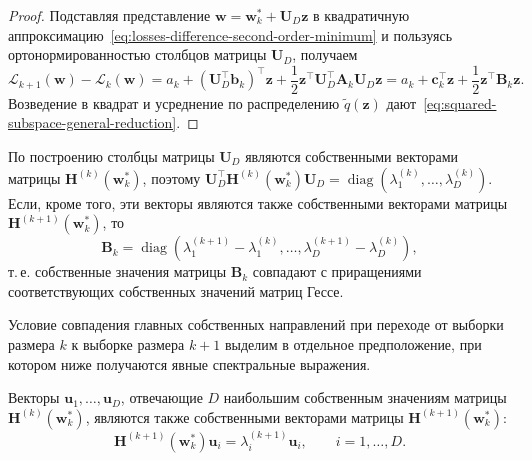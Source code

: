 \begin{proof}
    Подставляя представление $\mathbf w = \mathbf w_k^* + \mathbf U_D \mathbf z$ в квадратичную аппроксимацию~\eqref{eq:losses-difference-second-order-minimum} и пользуясь ортонормированностью столбцов матрицы $\mathbf U_D$, получаем
    \begin{equation}
        \mathcal L_{k+1}(\mathbf w) - \mathcal L_k(\mathbf w)
        =
        a_k
        +
        (\mathbf U_D^\top \mathbf b_k)^\top \mathbf z
        +
        \frac12 \mathbf z^\top \mathbf U_D^\top \mathbf A_k \mathbf U_D \mathbf z
        =
        a_k + \mathbf c_k^\top \mathbf z + \frac12 \mathbf z^\top \mathbf B_k \mathbf z.
    \end{equation}
    Возведение в квадрат и усреднение по распределению $\tilde q(\mathbf z)$ дают~\eqref{eq:squared-subspace-general-reduction}.
\end{proof}

\begin{remark}
    \label{rem:Bk-hessian-spectrum}
    По построению столбцы матрицы $\mathbf U_D$ являются собственными векторами матрицы $\mathbf H^{(k)}(\mathbf w_k^*)$, поэтому $\mathbf U_D^\top \mathbf H^{(k)}(\mathbf w_k^*) \mathbf U_D = \operatorname{diag}(\lambda_1^{(k)}, \ldots, \lambda_D^{(k)})$. Если, кроме того, эти векторы являются также собственными векторами матрицы $\mathbf H^{(k+1)}(\mathbf w_k^*)$, то
    \begin{equation}
        \label{eq:Bk-diagonal-eig-diffs}
        \mathbf B_k
        =
        \operatorname{diag}\left(
            \lambda_1^{(k+1)}-\lambda_1^{(k)},
            \ldots,
            \lambda_D^{(k+1)}-\lambda_D^{(k)}
        \right),
    \end{equation}
    т.\,е. собственные значения матрицы $\mathbf B_k$ совпадают с приращениями соответствующих собственных значений матриц Гессе.
\end{remark}

Условие совпадения главных собственных направлений при переходе от выборки размера $k$ к выборке размера $k+1$ выделим в отдельное предположение, при котором ниже получаются явные спектральные выражения.

\begin{assumption}
    \label{assumption:stable-principal-directions}
    Векторы $\mathbf u_1, \ldots, \mathbf u_D$, отвечающие $D$ наибольшим собственным значениям матрицы $\mathbf H^{(k)}(\mathbf w_k^*)$, являются также собственными векторами матрицы $\mathbf H^{(k+1)}(\mathbf w_k^*)$:
    \begin{equation}
        \mathbf H^{(k+1)}(\mathbf w_k^*) \mathbf u_i
        =
        \lambda_i^{(k+1)} \mathbf u_i,
        \qquad i=1, \ldots, D.
    \end{equation}
\end{assumption}

